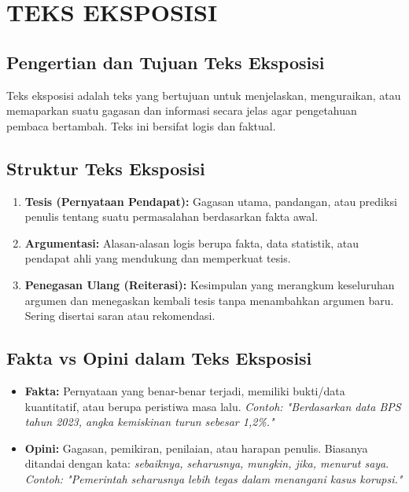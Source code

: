 \documentclass[12pt, a4paper]{article}
\begin{document}
\section{TEKS EKSPOSISI}

\subsection{Pengertian dan Tujuan Teks Eksposisi}
Teks eksposisi adalah teks yang bertujuan untuk menjelaskan, menguraikan, atau memaparkan suatu gagasan dan informasi secara jelas agar pengetahuan pembaca bertambah. Teks ini bersifat logis dan faktual.

\subsection{Struktur Teks Eksposisi}
\begin{enumerate}
    \item \textbf{Tesis (Pernyataan Pendapat):} Gagasan utama, pandangan, atau prediksi penulis tentang suatu permasalahan berdasarkan fakta awal.
    \item \textbf{Argumentasi:} Alasan-alasan logis berupa fakta, data statistik, atau pendapat ahli yang mendukung dan memperkuat tesis.
    \item \textbf{Penegasan Ulang (Reiterasi):} Kesimpulan yang merangkum keseluruhan argumen dan menegaskan kembali tesis tanpa menambahkan argumen baru. Sering disertai saran atau rekomendasi.
\end{enumerate}

\subsection{Fakta vs Opini dalam Teks Eksposisi}
\begin{itemize}
    \item \textbf{Fakta:} Pernyataan yang benar-benar terjadi, memiliki bukti/data kuantitatif, atau berupa peristiwa masa lalu. \textit{Contoh: "Berdasarkan data BPS tahun 2023, angka kemiskinan turun sebesar 1,2\%."}
    \item \textbf{Opini:} Gagasan, pemikiran, penilaian, atau harapan penulis. Biasanya ditandai dengan kata: \textit{sebaiknya, seharusnya, mungkin, jika, menurut saya}. \textit{Contoh: "Pemerintah seharusnya lebih tegas dalam menangani kasus korupsi."}
\end{itemize}
\end{document}
